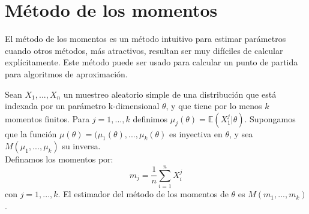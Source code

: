 \section{Método de los momentos}
El método de los momentos es un método intuitivo para estimar parámetros cuando otros métodos, más atractivos, resultan ser muy difíciles de calcular explícitamente. Este método puede ser usado para calcular un punto de partida para algoritmos de aproximación. 

\begin{definition} 
Sean $X_1,...,X_n$ un muestreo aleatorio simple de una distribución que está indexada por un parámetro k-dimensional $\theta$, y que tiene por lo menos $k$ momentos finitos.  Para $j=1,...,k$ definimos $\mu_{j}(\theta)=\mathbb{E}(X_{1}^{j}|\theta)$. Supongamos que la función $\mu(\theta)= (\mu_1 (\theta),...,\mu_k(\theta)$ es inyectiva en $\theta$, y sea $M(\mu_1, . . . , \mu_k)$ su inversa. \\
Definamos los momentos por: 
$$
m_{j}=\dfrac{1}{n} \sum_{i=1}^{n} X_{i}^{j}
$$
con $j=1,...,k$. El estimador del método de los momentos de $\theta$ es 
$M(m_1,...,m_k)$. 
\end{definition}

\begin{example}

\end{example}